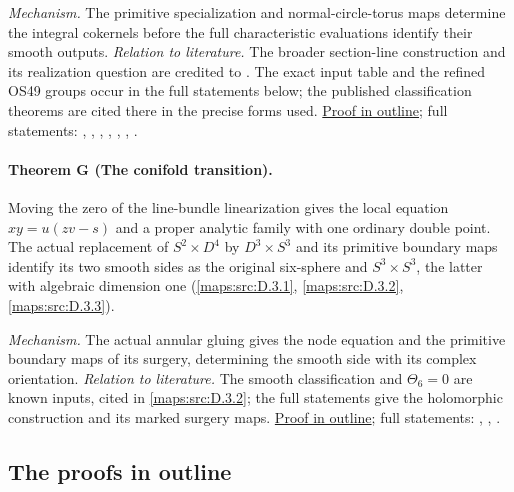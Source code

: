 \textit{Mechanism.} The primitive specialization and normal-circle-torus maps determine the integral cokernels before the full characteristic evaluations identify their smooth outputs.
\textit{Relation to literature.} The broader section-line construction and its realization question are credited to \cite[Remark~8.5]{E26}. The exact input table and the refined OS49 groups occur in the full statements below; the published classification theorems are cited there in the precise forms used.
\hyperlink{outline-III-F}{Proof in outline}; full statements: , , , , , , .

\hypertarget{main-III-G}{}
\paragraph{Theorem G (The conifold transition).}
\label{series:III:G}
Moving the zero of the line-bundle linearization gives the local
equation $xy=u(zv-s)$ and a proper analytic family with one ordinary
double point. The actual replacement of $S^2\times D^4$ by
$D^3\times S^3$ and its primitive boundary maps identify its two
smooth sides as the original six-sphere and $S^3\times S^3$,
the latter with algebraic dimension one
(\cref{maps:src:D.3.1}, \cref{maps:src:D.3.2}, \cref{maps:src:D.3.3}).

\textit{Mechanism.} The actual annular gluing gives the node equation and the primitive boundary maps of its surgery, determining the smooth side with its complex orientation.
\textit{Relation to literature.} The smooth classification and $\Theta_6=0$ are known inputs, cited in \cref{maps:src:D.3.2}; the full statements give the holomorphic construction and its marked surgery maps.
\hyperlink{outline-III-G}{Proof in outline}; full statements: , , .

\subsection{The proofs in outline}
\hypertarget{outline-III-A}{}
